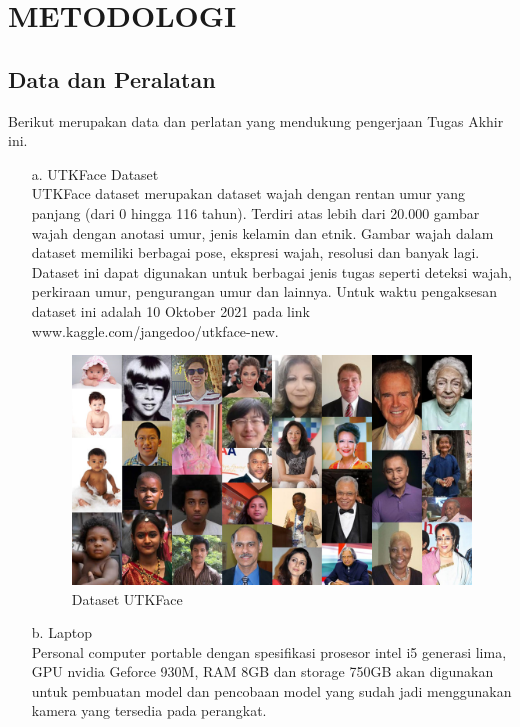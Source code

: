 \section{METODOLOGI}


\subsection{Data dan Peralatan}

Berikut merupakan data dan perlatan yang mendukung pengerjaan Tugas Akhir ini.
\begin{itemize}
   \item [a.] UTKFace Dataset \\
   UTKFace dataset  merupakan dataset wajah dengan rentan umur yang panjang (dari 0 hingga 116 tahun). 
   Terdiri atas lebih dari 20.000 gambar wajah dengan anotasi umur, jenis kelamin dan etnik. Gambar wajah
   dalam dataset memiliki berbagai pose, ekspresi wajah, resolusi dan banyak lagi. Dataset ini dapat 
   digunakan untuk berbagai jenis tugas seperti deteksi wajah, perkiraan umur, pengurangan umur dan 
   lainnya\citep{UTKFace}. Untuk waktu pengaksesan dataset ini adalah 10 Oktober 2021 pada link 
   www.kaggle.com/jangedoo/utkface-new.
    \begin{figure} [H] \centering
      \includegraphics[scale=0.2]{gambar/UTKFace.png}
      \caption{Dataset UTKFace}
      \label{fig:UTKFace}
    \end{figure}

   \item [b.] Laptop \\
   Personal computer portable dengan spesifikasi prosesor intel i5 generasi lima, GPU nvidia Geforce 930M, 
   RAM 8GB dan storage 750GB akan digunakan untuk pembuatan model dan pencobaan model yang sudah jadi 
   menggunakan kamera yang tersedia pada perangkat.


\end{itemize}
